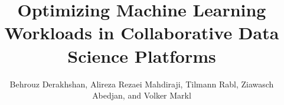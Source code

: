 \documentclass{vldb}
\begin{document}

\title{Optimizing Machine Learning Workloads in Collaborative Data Science Platforms}

%
%
%
%
%
\author{
{\large Behrouz Derakhshan, Alireza Rezaei Mahdiraji, Tilmann Rabl, Ziawasch Abedjan, and Volker Markl}\\
}


\maketitle














\end{document}

